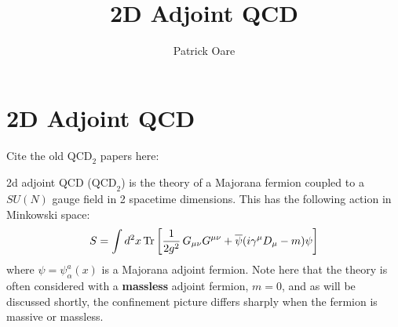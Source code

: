 \def \root {../../../notes_dropbox}			%


\usepackage{listings}

\newcommand{\QCDtwo}{\mathrm{QCD}_2}
\newcommand{\pf}{\mathrm{Pf}}
\newcommand{\poarecomment}[1]{\textcolor{red}{#1}}


\usepackage[numbers,sort&compress]{natbib}

\title{2D Adjoint QCD}
\author{Patrick Oare}
\date{}							%


\maketitle

\section{2D Adjoint QCD}

Cite the old $\QCDtwo$ papers here:

2d adjoint QCD ($\QCDtwo$) is the theory of a Majorana fermion coupled to a $SU(N)$ gauge field in 2 spacetime dimensions. This has the following action in Minkowski space:
\begin{equation}
	S = \int d^2x \,\mathrm{Tr} \left[ \frac{1}{2g^2} \, G_{\mu\nu} G^{\mu\nu} + \overline\psi ( i\gamma^\mu D_\mu - m) \psi \right]
\end{equation}
where $\psi = \psi^a_\alpha(x)$ is a Majorana adjoint fermion. Note here that the theory is often considered with a \textbf{massless} adjoint fermion, $m = 0$, and as will be discussed shortly, the confinement picture differs sharply when the fermion is massive or massless. 


